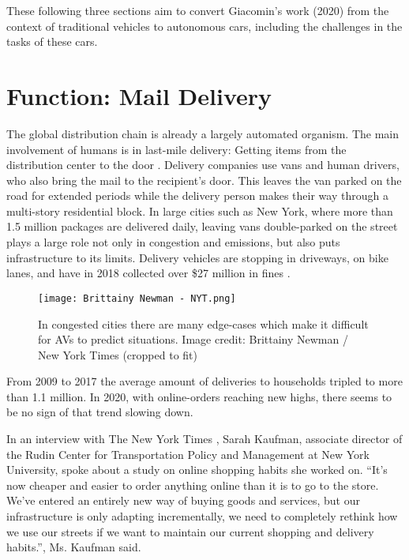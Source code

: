 \documentclass[12pt, usenames, dvipsnames]{report}
\begin{document}
\begin{flushleft}
These following three sections aim to convert Giacomin's work (2020) \cite{giacomin2020} from the context of traditional vehicles to autonomous cars, including the challenges in the tasks of these cars.


\section{Function: Mail Delivery}

The global distribution chain is already a largely automated organism. 
The main involvement of humans is in last-mile delivery:
Getting items from the distribution center to the door \cite{mckinsey2016}.
Delivery companies use vans and human drivers, who also bring the mail to the recipient's door.
This leaves the van parked on the road for extended periods while the delivery person makes their way through a multi-story residential block.
In large cities such as New York, where more than 1.5 million packages are delivered daily, leaving vans double-parked on the street plays a large role not only in congestion and emissions, but also puts infrastructure to its limits.
Delivery vehicles are stopping in driveways, on bike lanes, and have in 2018 collected over \$27 million in fines \cite{haag2019}.

\vspace*{0.8em}
\begin{figure}[!htbp]
  \hspace*{5em}
  \texttt{[image: Brittainy Newman - NYT.png]}
  \caption{In congested cities there are many edge-cases which make it difficult for AVs to predict situations. Image credit: Brittainy Newman / New York Times (cropped to fit)}
  \label{fig:newmannyt}
\end{figure}
\vspace*{0.6em}

From 2009 to 2017 the average amount of deliveries to households tripled to more than 1.1 million.
In 2020, with online-orders reaching new highs, there seems to be no sign of that trend slowing down.

In an interview with The New York Times \cite{haag2019}, Sarah Kaufman, associate director of the Rudin Center for Transportation Policy and Management at New York University, spoke about a study on online shopping habits she worked on.
“It’s now cheaper and easier to order anything online than it is to go to the store.
We’ve entered an entirely new way of buying goods and services, but our infrastructure is only adapting incrementally, we need to completely rethink how we use our streets if we want to maintain our current shopping and delivery habits.”, Ms. Kaufman said.


\end{flushleft}
\end{document}
